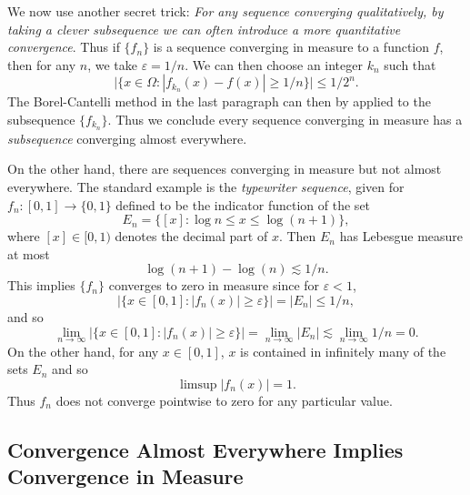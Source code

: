 \documentclass[answers]{exam}
\begin{document}
\begin{questions}
We now use another secret trick: \emph{For any sequence converging qualitatively, by taking a clever subsequence we can often introduce a more quantitative convergence}. Thus if $\{ f_n \}$ is a sequence converging in measure to a function $f$, then for any $n$, we take $\varepsilon = 1/n$. We can then choose an integer $k_n$ such that
%
\[ \Big| \{ x \in \Omega: |f_{k_n}(x) - f(x)| \geq 1/n \} \Big| \leq 1/2^n. \]
%
The Borel-Cantelli method in the last paragraph can then by applied to the subsequence $\{ f_{k_n} \}$. Thus we conclude every sequence converging in measure has a \emph{subsequence} converging almost everywhere.

On the other hand, there are sequences converging in measure but not almost everywhere. The standard example is the \emph{typewriter sequence}, given for $f_n: [0,1] \to \{ 0, 1 \}$ defined to be the indicator function of the set
%
\[ E_n = \{ [x] : \log n \leq x \leq \log(n+1) \}, \]
%
where $[x] \in [0,1)$ denotes the decimal part of $x$. Then $E_n$ has Lebesgue measure at most
%
\[ \log(n+1) - \log(n) \lesssim 1/n. \]
%
This implies $\{ f_n \}$ converges to zero in measure since for $\varepsilon < 1$,
%
\[ \Big| \{ x \in [0,1]: |f_n(x)| \geq \varepsilon \} \Big| = |E_n| \leq 1/n, \]
%
and so
%
\[ \lim_{n \to \infty} \Big| \{ x \in [0,1]: |f_n(x)| \geq \varepsilon \} \Big| = \lim_{n \to \infty} |E_n| \lesssim \lim_{n \to \infty} 1/n = 0. \]
%
On the other hand, for any $x \in [0,1]$, $x$ is contained in infinitely many of the sets $E_n$ and so
%
\[ \limsup |f_n(x)| = 1. \]
%
Thus $f_n$ does not converge pointwise to zero for any particular value.

\subsection*{Convergence Almost Everywhere Implies Convergence in Measure}


\end{questions}
\end{document}

